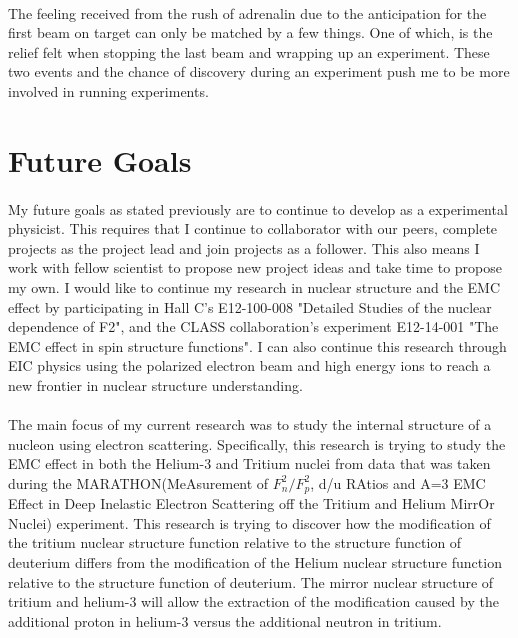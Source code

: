 \documentclass[12pt,letterpaper]{article}
\begin{document}
\paragraph{} The feeling received from the rush of adrenalin due to the anticipation for the first beam on target can only be matched by a few things. One of which, is the relief felt when stopping the last beam and wrapping up an experiment. These two events and the chance of discovery during an experiment push me to be more involved in running experiments.
\vspace{-1em}
\section*{Future Goals}
\paragraph{}My future goals as stated previously are to continue to develop as a experimental physicist. This requires that I continue to collaborator with our peers, complete projects as the project lead and join projects as a follower. This also means I work with fellow scientist to propose new project ideas and take time to propose my own. I would like to continue my research in nuclear structure and the EMC effect by participating in Hall C's E12-100-008 "Detailed Studies of the nuclear dependence of F2", and the CLASS collaboration's experiment E12-14-001 "The EMC effect in spin structure functions". I can also continue this research through EIC physics using the polarized electron beam and high energy ions to reach a new frontier in nuclear structure understanding. 







\iffalse
\paragraph{}The main focus of my current research was to study the internal structure of a nucleon using electron scattering. Specifically, this research is trying to study the EMC effect in both the Helium-3 and Tritium nuclei from data that was taken during the MARATHON(MeAsurement of $F_n^2/F_p^2$, d/u RAtios and A=3 EMC Effect in Deep Inelastic Electron Scattering off the Tritium and Helium MirrOr Nuclei) experiment. This research is trying to discover how the modification of the tritium nuclear structure function relative to the structure function of deuterium differs from the modification of the Helium nuclear structure function relative to the structure function of deuterium. The mirror nuclear structure of tritium and helium-3 will allow the extraction of the modification caused by the additional proton in helium-3 versus the additional neutron in tritium. 
\end{document}
